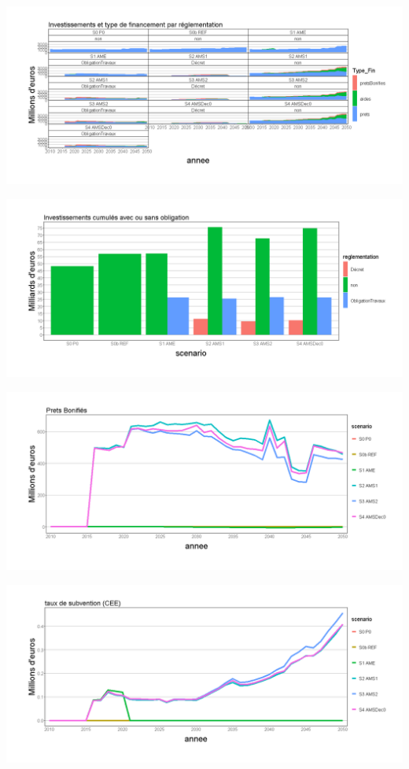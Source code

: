 \documentclass[]{article}
\begin{document}
\includegraphics{Exemple_sortiestertiaire_files/figure-latex/INV_aides_regl-1.png}

\includegraphics{Exemple_sortiestertiaire_files/figure-latex/INV_regl_bilan-1.png}

\includegraphics{Exemple_sortiestertiaire_files/figure-latex/INV_pretsBon-1.png}

\includegraphics{Exemple_sortiestertiaire_files/figure-latex/Taux_aides-1.png}
\end{document}
